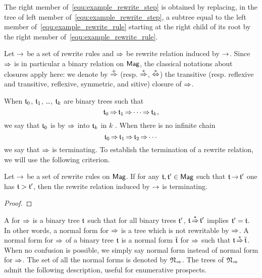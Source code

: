 The right member of~\eqref{equ:example_rewrite_step} is obtained by
replacing, in the tree of left member
of~\eqref{equ:example_rewrite_step}, a subtree equal to the left
member of~\eqref{equ:example_rewrite_rule} starting at the right child
of its root by the right member of~\eqref{equ:example_rewrite_rule}.
\medbreak

Let $\operatorname{\to}$ be a set of rewrite rules and $\operatorname{\Rightarrow}$ be rewrite
relation induced by $\operatorname{\to}$. Since $\operatorname{\Rightarrow}$ is in particular a
binary relation on $\mathsf{Mag}$, the classical notations about closures apply
here: we denote by $\operatorname{\overset{+}{\operatorname{\Rightarrow}}}$ (resp. $\operatorname{\overset{\ast}{\operatorname{\Rightarrow}}}$,
$\operatorname{\overset{\ast}{\Leftrightarrow}}$) the transitive (resp. reflexive and transitive,
reflexive, symmetric, and sitive) closure of $\operatorname{\Rightarrow}$.
\medbreak

When $\mathfrak{t}_0$, $\mathfrak{t}_1$, \dots, $\mathfrak{t}_k$ are binary trees such that
\begin{equation}
    \mathfrak{t}_0 \operatorname{\Rightarrow} \mathfrak{t}_1 \operatorname{\Rightarrow} \cdots \operatorname{\Rightarrow} \mathfrak{t}_k,
\end{equation}
we say that $\mathfrak{t}_0$ is  by $\operatorname{\Rightarrow}$ into $\mathfrak{t}_k$
in $k$ . When there is no infinite chain
\begin{equation} \label{equ:infinite_chain}
    \mathfrak{t}_0 \operatorname{\Rightarrow} \mathfrak{t}_1 \operatorname{\Rightarrow} \mathfrak{t}_2 \operatorname{\Rightarrow} \cdots
\end{equation}
we say that $\operatorname{\Rightarrow}$ is terminating. To establish the termination
of a rewrite relation, we will use the following criterion.
\medbreak

\begin{Lemma}\label{lem:prefix_word_termination}
    Let $\operatorname{\to}$ be a set of rewrite rules on $\mathsf{Mag}$. If for any
    $\mathfrak{t}, \mathfrak{t}' \in \mathsf{Mag}$ such that $\mathfrak{t} \operatorname{\to} \mathfrak{t}'$ one has
    $\mathfrak{t} > \mathfrak{t}'$, then the rewrite relation induced by $\operatorname{\to}$ is
    terminating.
\end{Lemma}
\begin{proof}
\end{proof}
\medbreak

A  for $\operatorname{\Rightarrow}$ is a binary tree $\mathfrak{t}$ such
that for all binary trees $\mathfrak{t}'$, $\mathfrak{t} \operatorname{\overset{\ast}{\operatorname{\Rightarrow}}} \mathfrak{t}'$ implies
$\mathfrak{t}' = \mathfrak{t}$. In other words, a normal form for $\operatorname{\Rightarrow}$ is a
tree which is not rewritable by $\operatorname{\Rightarrow}$. A normal form for
$\operatorname{\Rightarrow}$ of a binary tree $\mathfrak{t}$ is a normal form $\overline{\mathfrak{t}}$
for $\operatorname{\Rightarrow}$ such that $\mathfrak{t}\operatorname{\overset{\ast}{\operatorname{\Rightarrow}}}\overline{\mathfrak{t}}$. When no
confusion is possible, we simply say normal form instead of normal form
for $\operatorname{\Rightarrow}$. The set of all the normal forms is denoted by
$\mathfrak{N}_{\operatorname{\Rightarrow}}$. The trees of $\mathfrak{N}_{\operatorname{\Rightarrow}}$
admit the following description, useful for enumerative prospects.
\medbreak


